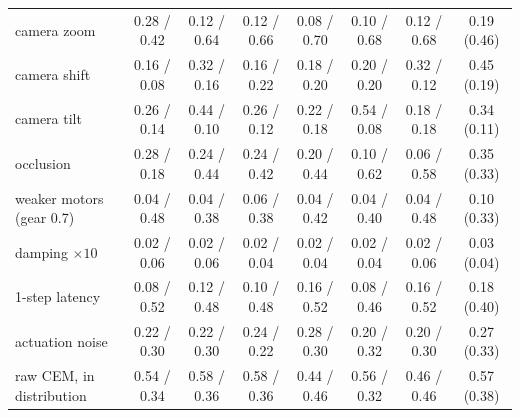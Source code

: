 \documentclass{article}
\begin{document}
\begin{table}[t]
{\begin{tabular}{lccccccc}
camera zoom & 0.28 / 0.42 & 0.12 / 0.64 & 0.12 / 0.66 & 0.08 / 0.70 & 0.10 / 0.68 & 0.12 / 0.68 & 0.19 (0.46) \\
camera shift & 0.16 / 0.08 & 0.32 / 0.16 & 0.16 / 0.22 & 0.18 / 0.20 & 0.20 / 0.20 & 0.32 / 0.12 & 0.45 (0.19) \\
camera tilt & 0.26 / 0.14 & 0.44 / 0.10 & 0.26 / 0.12 & 0.22 / 0.18 & 0.54 / 0.08 & 0.18 / 0.18 & 0.34 (0.11) \\
occlusion & 0.28 / 0.18 & 0.24 / 0.44 & 0.24 / 0.42 & 0.20 / 0.44 & 0.10 / 0.62 & 0.06 / 0.58 & 0.35 (0.33) \\
\midrule
weaker motors (gear 0.7) & 0.04 / 0.48 & 0.04 / 0.38 & 0.06 / 0.38 & 0.04 / 0.42 & 0.04 / 0.40 & 0.04 / 0.48 & 0.10 (0.33) \\
damping $\times 10$ & 0.02 / 0.06 & 0.02 / 0.06 & 0.02 / 0.04 & 0.02 / 0.04 & 0.02 / 0.04 & 0.02 / 0.06 & 0.03 (0.04) \\
1-step latency & 0.08 / 0.52 & 0.12 / 0.48 & 0.10 / 0.48 & 0.16 / 0.52 & 0.08 / 0.46 & 0.16 / 0.52 & 0.18 (0.40) \\
actuation noise & 0.22 / 0.30 & 0.22 / 0.30 & 0.24 / 0.22 & 0.28 / 0.30 & 0.20 / 0.32 & 0.20 / 0.30 & 0.27 (0.33) \\
\midrule
raw CEM, in distribution & 0.54 / 0.34 & 0.58 / 0.36 & 0.58 / 0.36 & 0.44 / 0.46 & 0.56 / 0.32 & 0.46 / 0.46 & 0.57 (0.38) \\
\bottomrule
\end{tabular}}
\end{table}
\end{document}
